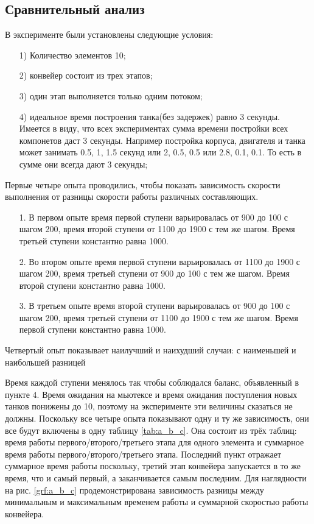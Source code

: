 \documentclass[a4paper, 14pt]{article}
\begin{document}
      
    \subsection{Сравнительный анализ}
    \hspace{1cm}В эксперименте были установлены следующие условия:
    
    \begin{enumerate}
	\item[1)] Количество элементов 10;
    \item[2)] конвейер состоит из трех этапов;
    \item[3)] один этап выполняется только одним потоком;
    \item[4)] идеальное время построения танка(без задержек) равно 3 секунды. Имеется в виду, что всех экспериментах сумма времени постройки всех компонетов даст 3 секунды. Например постройка корпуса, двигателя и танка может занимать 0.5, 1, 1.5 секунд или 2, 0.5, 0.5 или 2.8, 0.1, 0.1. То есть в сумме они всегда дают 3 секунды;
    \end{enumerate}
    
    Первые четыре опыта проводились, чтобы показать зависимость скорости выполнения от разницы скорости работы различных составляющих. 
     \begin{enumerate}
	\item[1.]  В первом опыте время первой ступени варьировалась от 900 до 100 с шагом 200, время второй ступени от 1100 до 1900 с тем же шагом. Время третьей ступени константно равна 1000.
    \item[2.] Во втором опыте время первой ступени варьировалась от 1100 до 1900 с шагом 200, время третьей ступени от 900 до 100 с тем же шагом. Время второй ступени константно равна 1000.
    \item[3.] В третьем опыте время второй ступени варьировалась от 900 до 100 с шагом 200, время третьей ступени от 1100 до 1900 с тем же шагом. Время первой ступени константно равна 1000.
     \end{enumerate}
    Четвертый опыт показывает наилучший и наихудший случаи: с наименьшей и наибольшей разницей
    
     Время каждой ступени менялось так чтобы соблюдался баланс, объявленный в пункте 4. Время ожидания на мьютексе и время ожидания поступления новых танков понижены до 10, поэтому на эксперименте эти величины сказаться не должны. Поскольку все четыре опыта показывают одну и ту же зависимость, они все будут включены в одну таблицу \ref{tab:a_b_c}. Она состоит из трёх таблиц: время работы первого/второго/третьего этапа для одного элемента и суммарное время работы первого/второго/третьего этапа. Последний пункт отражает суммарное время работы поскольку, третий этап конвейера запускается в то же время, что и самый первый, а заканчивается самым последним.  Для наглядности на рис. \ref{grf:a_b_c} продемонстрирована зависимость разницы между минимальным и максимальным временем работы и суммарной скоростью работы конвейера.
    
\end{document}
